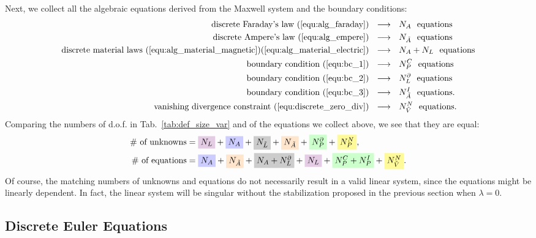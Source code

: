 \documentclass{article}
\begin{document}
Next, we collect all the algebraic equations derived from the Maxwell system and the boundary conditions: 
\begin{align*}
    \text{discrete Faraday's law (\ref{equ:alg_faraday})} \ \ &\longrightarrow\ \  N_A \ \ \text{equations} \\
    \text{discrete Ampere's law (\ref{equ:alg_empere})} \ \ &\longrightarrow\ \  N_{\Tilde{A}} \ \ \text{equations} \\
    \text{discrete material laws (\ref{equ:alg_material_magnetic})(\ref{equ:alg_material_electric})} \ \ &\longrightarrow\ \  N_A + N_L \ \ \text{equations} \\
    \text{boundary condition (\ref{equ:bc_1})} \ \ &\longrightarrow\ \  N_P^C \ \ \text{equations} \\
    \text{boundary condition (\ref{equ:bc_2})} \ \ &\longrightarrow\ \  N_L^\partial \ \ \text{equations} \\
    \text{boundary condition (\ref{equ:bc_3})} \ \ &\longrightarrow\ \  N_{\Tilde{A}}^I \ \ \text{equations}. \\
    \text{vanishing divergence constraint (\ref{equ:discrete_zero_div})} \ \ &\longrightarrow\ \  N_{\Tilde{V}}^{N} \ \ \text{equations}. \\
\end{align*}
Comparing the numbers of d.o.f. in Tab.~\ref{tab:def_size_var} and of the equations we
collect above, we see that they are equal:
\begin{align*}
    \#\text{ of unknowns} &= \colorbox{violet!20}{$N_L$} + \colorbox{blue!20}{$N_A$} + \colorbox{gray!40}{$N_{\Tilde{L}}$} + \colorbox{orange!20}{$N_{\Tilde{A}}$} + \colorbox{green!20}{$N_P^\partial$} + \colorbox{yellow!40}{$N_P^{N}$}, \\
    \#\text{ of equations} &= \colorbox{blue!20}{$N_A$} + \colorbox{orange!20}{$N_{\Tilde{A}}$} + \colorbox{gray!40}{$N_A+N_L^\partial$} + \colorbox{violet!20}{$N_L$} + \colorbox{green!20}{$N_P^C + N_P^I$}+ \colorbox{yellow!40}{$N_{\Tilde{V}}^N$}.
\end{align*}
Of course, the matching numbers of unknowns and equations do not necessarily result in a
valid linear system, since the equations might be linearly dependent. In fact, the linear
system will be singular without the stabilization proposed in the previous section when
$\lambda = 0$.

\subsection{Discrete Euler Equations} \label{sec:discrete_euler}
\end{document}
